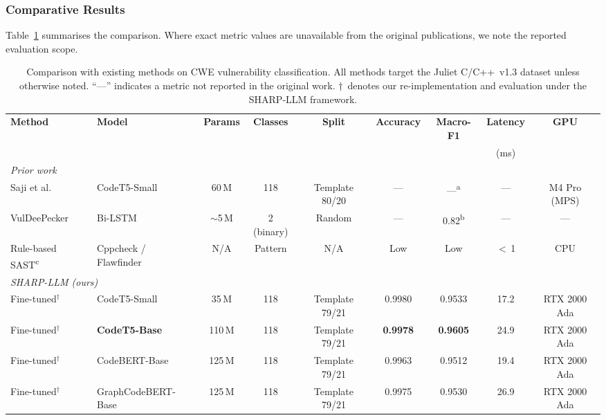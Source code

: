 \subsubsection{Comparative Results}
Table~\ref{tab:baseline_comparison} summarises the comparison.  Where
exact metric values are unavailable from the original publications, we
note the reported evaluation scope.

\begin{table}[t]
\centering
\caption{Comparison with existing methods on CWE vulnerability
         classification.  All methods target the Juliet C/C++~v1.3 dataset
         unless otherwise noted.  ``---'' indicates a metric not reported
         in the original work.  $\dagger$~denotes our re-implementation
         and evaluation under the SHARP-LLM framework.}
\label{tab:baseline_comparison}
\begin{tabular}{llccccccc}
\hline
\textbf{Method} &
\textbf{Model} &
\textbf{Params} &
\textbf{Classes} &
\textbf{Split} &
\textbf{Accuracy} &
\textbf{Macro-F1} &
\textbf{Latency} &
\textbf{GPU} \\
& & & & & & & (ms) & \\
\hline
\multicolumn{9}{l}{\textit{Prior work}} \\
\hline
Saji et al.~\cite{saji2025efficient}
    & CodeT5-Small      & 60\,M  & 118  & Template 80/20
    & --- & ---\textsuperscript{a} & ---
    & M4 Pro (MPS) \\
VulDeePecker~\cite{li2018vuldeepecker}
    & Bi-LSTM           & $\sim$5\,M & 2 (binary) & Random
    & --- & 0.82\textsuperscript{b} & ---
    & --- \\
Rule-based SAST\textsuperscript{c}
    & Cppcheck / Flawfinder & N/A  & Pattern & N/A
    & Low & Low & $<$\,1
    & CPU \\
\hline
\multicolumn{9}{l}{\textit{SHARP-LLM (ours)}} \\
\hline
Fine-tuned$^{\dagger}$
    & CodeT5-Small       & 35\,M  & 118 & Template 79/21
    & 0.9980 & 0.9533 & 17.2
    & RTX 2000 Ada \\
Fine-tuned$^{\dagger}$
    & \textbf{CodeT5-Base}  & 110\,M & 118 & Template 79/21
    & \textbf{0.9978} & \textbf{0.9605} & 24.9
    & RTX 2000 Ada \\
Fine-tuned$^{\dagger}$
    & CodeBERT-Base      & 125\,M & 118 & Template 79/21
    & 0.9963 & 0.9512 & 19.4
    & RTX 2000 Ada \\
Fine-tuned$^{\dagger}$
    & GraphCodeBERT-Base & 125\,M & 118 & Template 79/21
    & 0.9975 & 0.9530 & 26.9
    & RTX 2000 Ada \\

\end{tabular}
\end{table}
